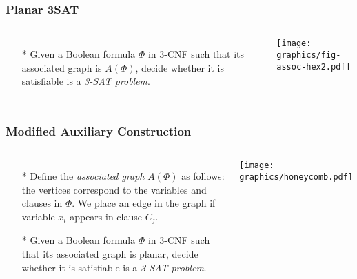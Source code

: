 \documentclass{beamer}
\begin{document}
\begin{frame} \frametitle{Planar 3SAT}
    \begin{columns}[c]
        \begin{itemize}
            \item[*] Given a Boolean formula $\Phi$ in 3-CNF such that its associated graph is $A(\Phi)$, decide whether it 
is satisfiable is a \textit{3-SAT problem}.
        \end{itemize}
        \begin{minipage}{\linewidth}
            \begin{center}
            \texttt{[image: graphics/fig-assoc-hex2.pdf]}
            \end{center}
        \end{minipage}
    \end{columns}
\end{frame}
\begin{frame} \frametitle{Modified Auxiliary Construction}
    \begin{columns}[c]
        \begin{itemize}
            \item[*] Define the \textit{associated graph} $A(\Phi)$ as follows: the vertices correspond to the variables and clauses in $\Phi$.   
We place an edge in the graph if variable $x_i$ appears in clause $C_j$.
            \item[*] Given a Boolean formula $\Phi$ in 3-CNF such that its associated graph is planar, decide whether it 
is satisfiable is a \textit{3-SAT problem}.
        \end{itemize}
        \begin{minipage}{\linewidth}
            \begin{center}
            \texttt{[image: graphics/honeycomb.pdf]}
            \end{center}
        \end{minipage}
    \end{columns}
\end{frame}
\end{document}
